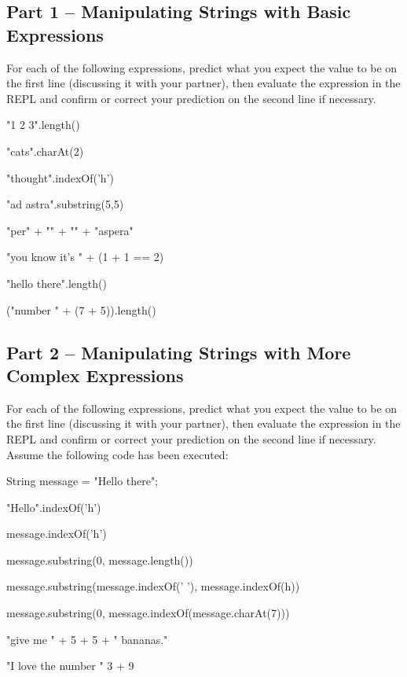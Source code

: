\subsection{Part 1 -- Manipulating Strings with Basic Expressions}

\begin{eval}
For each of the following expressions, predict what you expect the value to be on the first line (discussing it with your partner), then evaluate the expression in the REPL and confirm or correct your prediction on the second line if necessary. 
\begin{sevalenum}
\item "1 2 3".length()
\evallinetwo
\item "cats".charAt(2)
\evallinetwo
\item "thought".indexOf('h')
\evallinetwo
\item "ad astra".substring(5,5)
\evallinetwo
\item "per" + "" + "" + "aspera"
\evallinetwo
\item "you know it's " + (1 + 1 == 2)
\evallinetwo
\item "hello   there".length()
\evallinetwo
\item ("number " + (7 + 5)).length()
\evallinetwo
\end{sevalenum}
\end{eval}



\initialbox

\subsection{Part 2 -- Manipulating Strings with More Complex Expressions}

\begin{eval}
For each of the following expressions, predict what you expect the value to be on the first line (discussing it with your partner), then evaluate the expression in the REPL and confirm or correct your prediction on the second line if necessary. Assume the following code has been executed:

\begin{code}
String message = "Hello there";
\end{code}

\begin{sevalenum}
\item "Hello".indexOf('h')
\evallinetwo
\item message.indexOf('h')
\evallinetwo
\item message.substring(0, message.length())
\evallinetwo
\item message.substring(message.indexOf(' '), message.indexOf(h))
\evallinetwo
\item message.substring(0, message.indexOf(message.charAt(7)))
\evallinetwo
\item "give me " + 5 + 5 + " bananas."
\evallinetwo
\item "I love the number " 3 + 9
\evallinetwo
\end{sevalenum}
\end{eval}

